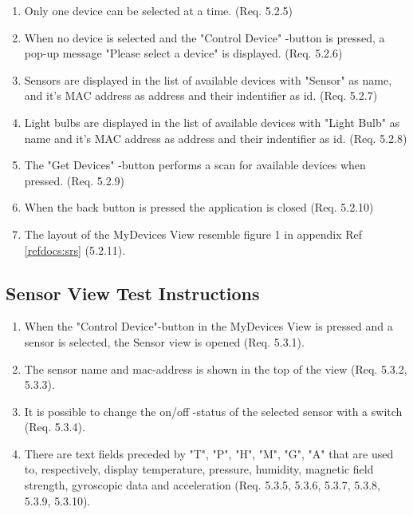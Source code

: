 \documentclass[a4paper]{article}
\newlength{\testlabellength}
\newenvironment{testlist}{\begin{enumerate}[label=\bfseries Instruction \thesubsection.\arabic* , labelindent=0pt, labelwidth=\testlabellength , leftmargin=2cm]}{\end{enumerate}}
\begin{document}
\begin{appendices}
\begin{testlist}
    \item Only one device can be selected at a time. (Req. 5.2.5)
   
    \item When no device is selected and the "Control Device" -button is pressed, a pop-up message "Please select a device" is displayed. (Req. 5.2.6)
   
    \item Sensors are displayed in the list of available devices with "Sensor" as name, and it's MAC address as address and their indentifier as id. (Req. 5.2.7)
   
    \item Light bulbs are displayed in the list of available devices with "Light Bulb" as name and it's MAC address as address and their indentifier as id. (Req. 5.2.8)
   
    \item The "Get Devices" -button performs a scan for available devices when pressed. (Req. 5.2.9)
   
    \item When the back button is pressed the application is closed (Req. 5.2.10)
    
    \item The layout of the MyDevices View resemble figure 1 in appendix  Ref \ref{refdocs:srs} (5.2.11).
\end{testlist}

\subsection{Sensor View Test Instructions}
\begin{testlist}
\item When the "Control Device"-button in the MyDevices View is pressed and a sensor is selected, the Sensor view is opened (Req. 5.3.1).

\item The sensor name and mac-address is shown in the top of the view (Req. 5.3.2, 5.3.3).
 
\item It is possible to change the on/off -status of the selected sensor with a switch (Req. 5.3.4).

\item There are text fields preceded by "T", "P", "H", "M", "G", "A" that are used to, respectively, display temperature, pressure, humidity, magnetic field strength, gyroscopic data and acceleration (Req. 5.3.5, 5.3.6, 5.3.7, 5.3.8, 5.3.9, 5.3.10).


\end{testlist}
\end{appendices}
\end{document}

